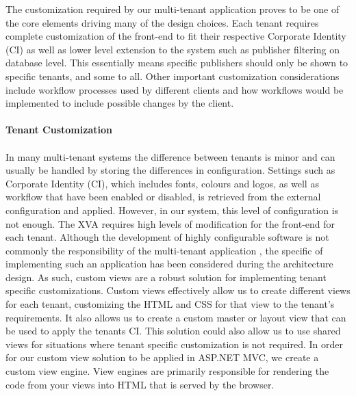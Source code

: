 The customization required by our multi-tenant application proves to be one of the core elements driving many of the design choices. Each tenant requires complete customization of the front-end to fit their respective Corporate Identity (CI) as well as lower level extension to the system such as publisher filtering on database level. This essentially means specific publishers should only be shown to specific tenants, and some to all. Other important customization considerations include workflow processes used by different clients and how workflows would be implemented to include possible changes by the client.
\\
\\
\textbf{Tenant Customization}
\\
\\
\label{sec:viewengine}
In many multi-tenant systems the difference between tenants is minor and can usually be handled by storing the differences in configuration. Settings such as Corporate Identity (CI), which includes fonts, colours and logos, as well as workflow that have been enabled or disabled, is retrieved from the external configuration and applied. However, in our system, this level of configuration is not enough. The XVA requires high levels of modification for the front-end for each tenant. Although the development of highly configurable software is not commonly the responsibility of the multi-tenant application \cite{Krebs2012}, the specific of implementing such an application has been considered during the architecture design. As such, custom views are a robust solution for implementing tenant specific customizations. Custom views effectively allow us to create different views for each tenant, customizing the HTML and CSS for that view to the tenant's requirements. It also allows us to create a custom master or layout view that can be used to apply the tenants CI. This solution could also allow us to use shared views for situations where tenant specific customization is not required. In order for our custom view solution to be applied in ASP.NET  MVC, we create a custom view engine. View engines are primarily responsible for rendering the code from your views into HTML that is served by the browser.

